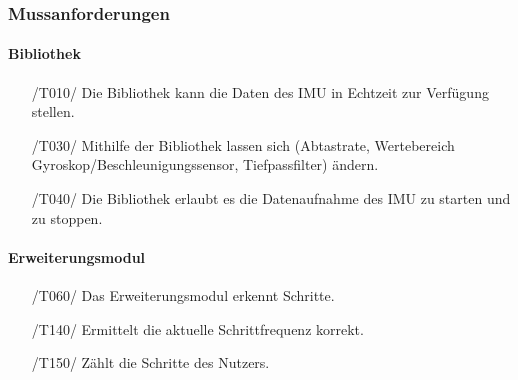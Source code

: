 \documentclass[a4paper,12pt]{article}
\begin{document}
  \subsubsection{Mussanforderungen}
  \paragraph{Bibliothek}
  \begin{itemize}
    \item[/T010/] Die Bibliothek kann die Daten des \Gls{IMU} in \Gls{Echtzeit} zur Verfügung stellen.
    \item[/T030/] Mithilfe der Bibliothek lassen sich (Abtastrate, Wertebereich Gyroskop/Beschleunigungssensor, Tiefpassfilter) ändern. 
    \item[/T040/] Die Bibliothek erlaubt es die Datenaufnahme des \Gls{IMU} zu starten und zu stoppen.
  \end{itemize}
  \paragraph{Erweiterungsmodul}
  \begin{itemize}
    \item[/T060/] Das Erweiterungsmodul erkennt Schritte.
    \item[/T140/] Ermittelt die aktuelle \Gls{Schrittfrequenz} korrekt.
    \item[/T150/] Zählt die Schritte des Nutzers.
  \end{itemize}
\end{document}
